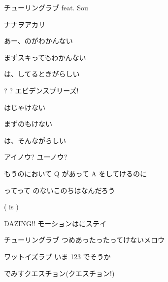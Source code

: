 \documentclass[a4paper,tate,twocolumn,12pt]{ltjtarticle}
\begin{document}
\thispagestyle{empty}

\begin{center}
{\LARGE チューリングラブ feat. Sou}

{\large ナナヲアカリ}
\end{center}

\vspace{1em}

\begin{flushleft}

\noindent\begin{minipage}{\linewidth}
あー、のがわかんない

まずスキってもわかんない

は、してるときがらしい

? ? エビデンスプリーズ!

はじゃけない

まずのもけない

は、そんながらしい

アイノウ? ユーノウ?
\end{minipage}

\vspace{2em}

\noindent\begin{minipage}{\linewidth}
もうのにおいて Q があって A をしてけるのに

ってって のないこのちはなんだろう

( is )

DAZING!! モーションはにステイ
\end{minipage}

\vspace{2em}

\noindent\begin{minipage}{\linewidth}
チューリングラブ つめあったったってけないメロウ

ワットイズラブ いま 123 でそうか

でみすクエスチョン(クエスチョン!)


\end{minipage}
\end{flushleft}
\end{document}
